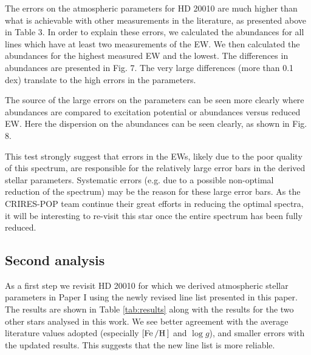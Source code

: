 The errors on the atmospheric parameters for HD 20010 are much higher than what is achievable with
other measurements in the literature, as presented above in Table 3. In order to explain these
errors, we calculated the abundances for all lines which have at least two measurements of the EW.
We then calculated the abundances for the highest measured EW and the lowest. The differences in
abundances are presented in Fig. 7. The very large differences (more than 0.1 dex) translate to the
high errors in the parameters.

The source of the large errors on the parameters can be seen more clearly where abundances are
compared to excitation potential or abundances versus reduced EW. Here the dispersion on the
abundances can be seen clearly, as shown in Fig. 8.

This test strongly suggest that errors in the EWs, likely due to the poor quality of this spectrum,
are responsible for the relatively large error bars in the derived stellar parameters. Systematic
errors (e.g. due to a possible non-optimal reduction of the spectrum) may be the reason for these
large error bars. As the CRIRES-POP team continue their great efforts in reducing the optimal
spectra, it will be interesting to re-visit this star once the entire spectrum has been fully
reduced.

\subsection{Second analysis}

As a first step we revisit HD 20010 for which we derived atmospheric stellar parameters in Paper I
using the newly revised line list presented in this paper. The results are shown in Table
\ref{tab:results} along with the results for the two other stars analysed in this work. We see
better agreement with the average literature values adopted (especially $[\ion{Fe}/\ion{H}]$ and
$\log g$), and smaller errors with the updated results. This suggests that the new line list is more
reliable.

